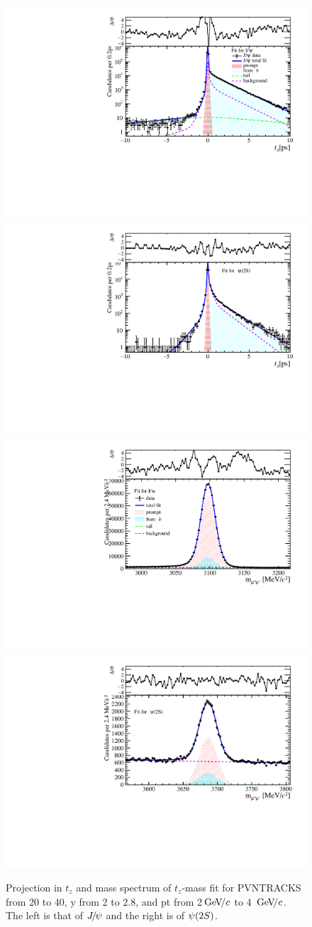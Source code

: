  \begin{figure}[!tbp]
   \begin{center}
     \includegraphics[width=0.49\linewidth]{pdf/Jpsi/2DFit/n2y1pt2.pdf}
     \includegraphics[width=0.49\linewidth]{pdf/Psi2S/2DFit/n2y1pt2.pdf}
     \includegraphics[width=0.49\linewidth]{pdf/Jpsi/drawmass/n2y1pt2.pdf}
     \includegraphics[width=0.49\linewidth]{pdf/Psi2S/drawmass/n2y1pt2.pdf}
   \end{center}
   \caption{
     Projection in $t_z$ and mass spectrum of $t_z$-mass fit for PVNTRACKS from 20 to 40, y from 2 to 2.8, and pt from 2$\text{\,Ge\kern -0.1em V\!/}c$ to 4 $\text{\,Ge\kern -0.1em V\!/}c$. The left is that of ${{J\mskip -3mu/\mskip -2mu\psi}}$ and the right is of ${\psi{(2S)}}$.
     }
   \label{fig:2Dtz}
 \end{figure}

